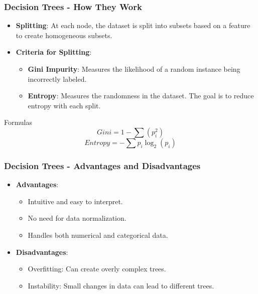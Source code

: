 \documentclass{beamer}
\begin{document}
\begin{frame}[fragile]
    \frametitle{Decision Trees - How They Work}
    \begin{itemize}
        \item \textbf{Splitting}: At each node, the dataset is split into subsets based on a feature to create homogeneous subsets.

        \item \textbf{Criteria for Splitting}:
        \begin{itemize}
            \item \textbf{Gini Impurity}: Measures the likelihood of a random instance being incorrectly labeled.
            \item \textbf{Entropy}: Measures the randomness in the dataset. The goal is to reduce entropy with each split.
        \end{itemize}
    \end{itemize}

    \begin{block}{Formulas}
        \begin{equation}
            Gini = 1 - \sum (p_i^2)
        \end{equation}
        \begin{equation}
            Entropy = - \sum p_i \log_2(p_i)
        \end{equation}
    \end{block}
\end{frame}

\begin{frame}[fragile]
    \frametitle{Decision Trees - Advantages and Disadvantages}
    \begin{itemize}
        \item \textbf{Advantages}:
        \begin{itemize}
            \item Intuitive and easy to interpret.
            \item No need for data normalization.
            \item Handles both numerical and categorical data.
        \end{itemize}
        
        \item \textbf{Disadvantages}:
        \begin{itemize}
            \item Overfitting: Can create overly complex trees.
            \item Instability: Small changes in data can lead to different trees.
        \end{itemize}
    \end{itemize}
\end{frame}
\end{document}
